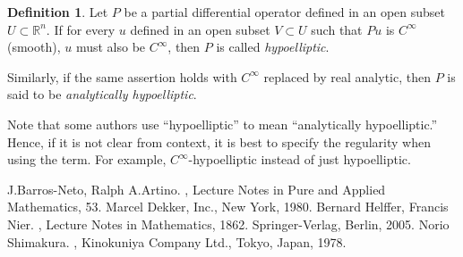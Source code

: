 \documentclass[12pt]{article}
\theoremstyle{theorem}
\theoremstyle{definition}
\newtheorem*{defn}{Definition}
\theoremstyle{remark}
\begin{document}
\begin{defn}
Let $P$ be a partial differential operator defined in an open subset $U \subset{\mathbb{R}}^n$.
If
for every  $u$ defined in an open subset $V \subset U$ such that
$Pu$ is $C^\infty$ (smooth), $u$ must also be $C^\infty$, then $P$ is
called {\em hypoelliptic}.
\end{defn}

Similarly, if the same assertion holds with $C^\infty$ replaced by
real analytic,
then $P$ is said to be {\em analytically hypoelliptic}.

Note that some authors use ``hypoelliptic'' to mean ``analytically hypoelliptic.''  Hence, if it is not clear from context, it is best to specify the regularity when using the term.  For example, $C^\infty$-hypoelliptic instead of just hypoelliptic.


\begin{thebibliography}{9}
J.\@ Barros-Neto, Ralph A.\@ Artino.
{\em {}},
Lecture Notes in Pure and Applied Mathematics, 53. Marcel Dekker, Inc., New York, 1980.
Bernard Helffer, Francis Nier.
{\em {}},
Lecture Notes in Mathematics, 1862. Springer-Verlag, Berlin, 2005.
Norio Shimakura.
{\em {}},
Kinokuniya Company Ltd., Tokyo, Japan, 1978.
\end{thebibliography}

\end{document}
